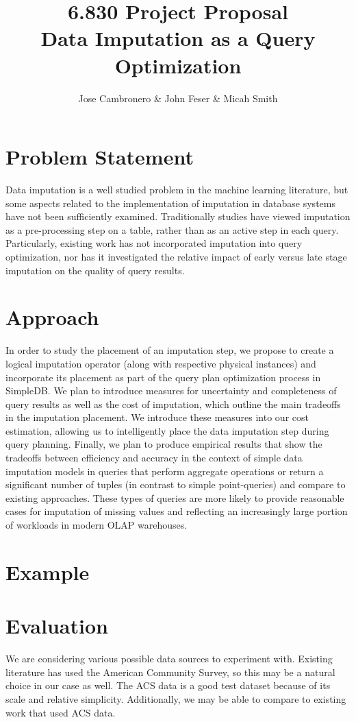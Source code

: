 \documentclass{article}
\title{6.830 Project Proposal \\
  \large Data Imputation as a Query Optimization}
\author{Jose Cambronero \& John Feser \& Micah Smith}
\begin{document}
\maketitle

\section{Problem Statement}
Data imputation is a well studied problem in the machine learning literature, but some aspects related to the implementation of imputation in database systems have not been sufficiently examined. Traditionally studies have viewed imputation as a pre-processing step on a table, rather than as an active step in each query. Particularly, existing work has not incorporated imputation into query optimization, nor has it investigated the relative impact of early versus late stage imputation on the quality of query results.

\section{Approach}
In order to study the placement of an imputation step, we propose to create a logical imputation operator (along with respective physical instances) and incorporate its placement as part of the query plan optimization process in SimpleDB.  We plan to introduce measures for uncertainty and completeness of query results as well as the cost of imputation, which outline the main tradeoffs in the imputation placement. We introduce these measures into our cost estimation, allowing us to intelligently place the data imputation step during query planning. Finally, we plan to produce empirical results that show the tradeoffs between efficiency and accuracy in the context of simple data imputation models in queries that perform aggregate operations or return a significant number of tuples (in contrast to simple point-queries) and compare to existing approaches.  These types of queries are more likely to provide reasonable cases for imputation of missing values and reflecting an increasingly large portion of workloads in modern OLAP warehouses.

\section{Example}

\section{Evaluation}
We are considering various possible data sources to experiment with. Existing literature has used the American Community Survey, so this may be a natural choice in our case as well. The ACS data is a good test dataset because of its scale and relative simplicity. Additionally, we may be able to compare to existing work that used ACS data.
\end{document}

